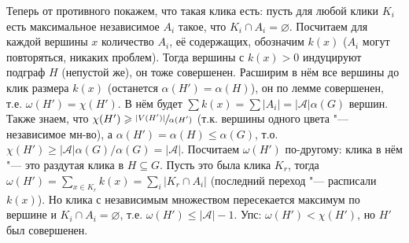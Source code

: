 	Теперь от противного покажем, что такая клика есть: пусть для любой клики $K_i$ есть максимальное независимое $A_i$ такое, что $K_i \cap A_i=\varnothing$.
	Посчитаем для каждой вершины $x$ количество $A_i$, её содержащих, обозначим $k(x)$ ($A_i$ могут повторяться, никаких проблем).
	Тогда вершины с $k(x)>0$ индуцируют подграф $H$ (непустой же), он тоже совершенен.
	Расширим в нём все вершины до клик размера $k(x)$ (останется $\alpha(H')=\alpha(H)$), он по лемме совершенен, т.е. $\omega(H')=\chi(H')$.
	В нём будет $\sum k(x) = \sum |A_i| = |\mathcal{A}|\alpha(G)$ вершин.
	Также знаем, что $\chi(H') \geqslant \sfrac{|V(H')|}{\alpha(H')}$ (т.к. вершины одного цвета "--- независимое мн-во), а $\alpha(H') = \alpha(H) \le \alpha(G)$, т.о.
	$\chi(H')\ge |\mathcal{A}|\alpha(G)/\alpha(G)=|\mathcal{A}|$.
	Посчитаем $\omega(H')$ по-другому: клика в нём "--- это раздутая клика в $H\subseteq G$.
	Пусть это была клика $K_r$, тогда $\omega(H')=\sum_{x \in K_r} k(x)=\sum_{i} |K_r \cap A_i|$ (последний переход "--- расписали $k(x)$).
	Но клика с независимым множеством пересекается максимум по вершине и $K_i \cap A_i=\varnothing$, т.е. $\omega(H') \le |\mathcal{A}|-1$.
	Упс: $\omega(H') < \chi(H')$, но $H'$ был совершенен.
